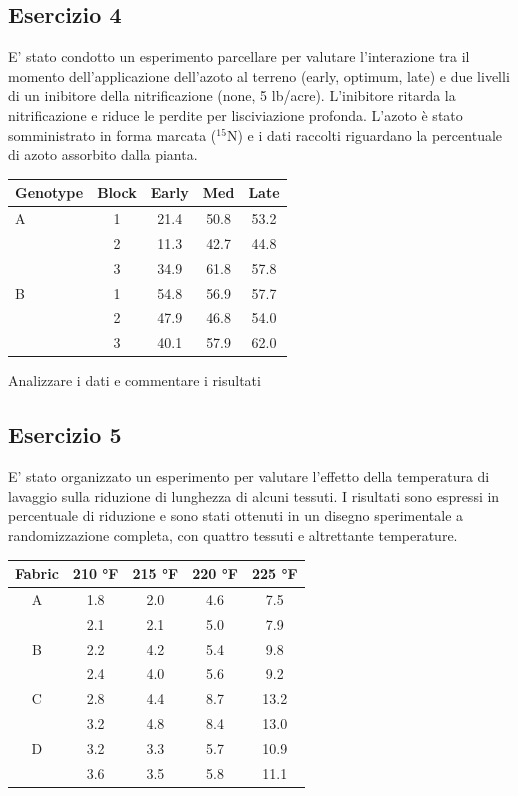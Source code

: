 \documentclass[a4paper,12pt,oneside]{book}
\begin{document}
\hypertarget{esercizio-4-4}{%
\subsection{Esercizio 4}\label{esercizio-4-4}}

E' stato condotto un esperimento parcellare per valutare l'interazione tra il momento dell'applicazione dell'azoto al terreno (early, optimum, late) e due livelli di un inibitore della nitrificazione (none, 5 lb/acre). L'inibitore ritarda la nitrificazione e riduce le perdite per lisciviazione profonda. L'azoto è stato somministrato in forma marcata (\(^{15}\)N) e i dati raccolti riguardano la percentuale di azoto assorbito dalla pianta.

\begin{longtable}[]{@{}lcccc@{}}
\toprule
Genotype & Block & Early & Med & Late \\
\midrule
\endhead
A & 1 & 21.4 & 50.8 & 53.2 \\
& 2 & 11.3 & 42.7 & 44.8 \\
& 3 & 34.9 & 61.8 & 57.8 \\
B & 1 & 54.8 & 56.9 & 57.7 \\
& 2 & 47.9 & 46.8 & 54.0 \\
& 3 & 40.1 & 57.9 & 62.0 \\
\bottomrule
\end{longtable}

Analizzare i dati e commentare i risultati

\hypertarget{esercizio-5-3}{%
\subsection{Esercizio 5}\label{esercizio-5-3}}

E' stato organizzato un esperimento per valutare l'effetto della temperatura di lavaggio sulla riduzione di lunghezza di alcuni tessuti. I risultati sono espressi in percentuale di riduzione e sono stati ottenuti in un disegno sperimentale a randomizzazione completa, con quattro tessuti e altrettante temperature.

\begin{longtable}[]{@{}ccccc@{}}
\toprule
Fabric & 210 °F & 215 °F & 220 °F & 225 °F \\
\midrule
\endhead
A & 1.8 & 2.0 & 4.6 & 7.5 \\
& 2.1 & 2.1 & 5.0 & 7.9 \\
B & 2.2 & 4.2 & 5.4 & 9.8 \\
& 2.4 & 4.0 & 5.6 & 9.2 \\
C & 2.8 & 4.4 & 8.7 & 13.2 \\
& 3.2 & 4.8 & 8.4 & 13.0 \\
D & 3.2 & 3.3 & 5.7 & 10.9 \\
& 3.6 & 3.5 & 5.8 & 11.1 \\
\bottomrule
\end{longtable}
\end{document}
